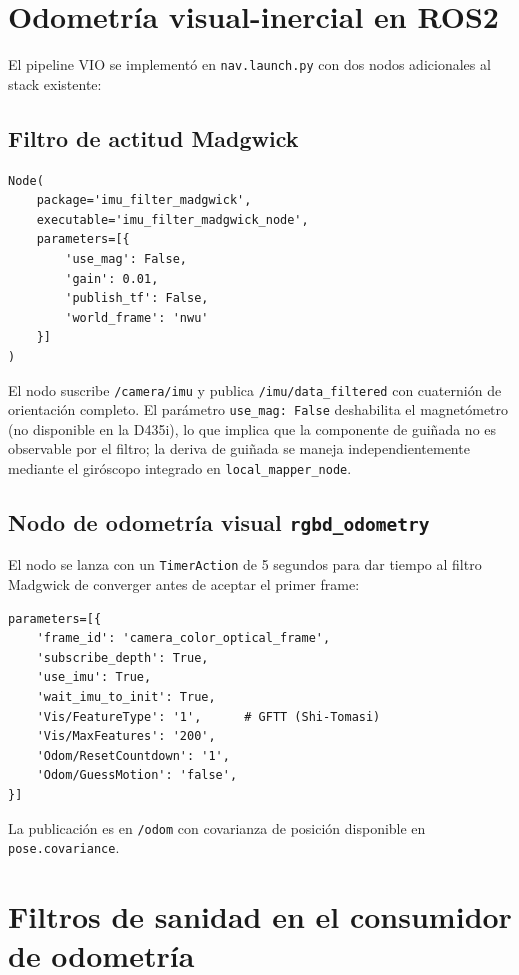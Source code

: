 \section{Odometría visual-inercial en ROS2}
\label{sec:impl-vio}

El pipeline VIO se implementó en \texttt{nav.launch.py} con dos nodos adicionales al stack existente:

\subsection{Filtro de actitud Madgwick}

\begin{verbatim}
Node(
    package='imu_filter_madgwick',
    executable='imu_filter_madgwick_node',
    parameters=[{
        'use_mag': False,
        'gain': 0.01,
        'publish_tf': False,
        'world_frame': 'nwu'
    }]
)
\end{verbatim}

El nodo suscribe \texttt{/camera/imu} y publica \texttt{/imu/data\_filtered} con cuaternión de orientación completo. El parámetro \texttt{use\_mag: False} deshabilita el magnetómetro (no disponible en la D435i), lo que implica que la componente de guiñada no es observable por el filtro; la deriva de guiñada se maneja independientemente mediante el giróscopo integrado en \texttt{local\_mapper\_node}.

\subsection{Nodo de odometría visual \texttt{rgbd\_odometry}}

El nodo se lanza con un \texttt{TimerAction} de 5 segundos para dar tiempo al filtro Madgwick de converger antes de aceptar el primer frame:

\begin{verbatim}
parameters=[{
    'frame_id': 'camera_color_optical_frame',
    'subscribe_depth': True,
    'use_imu': True,
    'wait_imu_to_init': True,
    'Vis/FeatureType': '1',      # GFTT (Shi-Tomasi)
    'Vis/MaxFeatures': '200',
    'Odom/ResetCountdown': '1',
    'Odom/GuessMotion': 'false',
}]
\end{verbatim}

La publicación es en \texttt{/odom} con covarianza de posición disponible en \texttt{pose.covariance}.

\section{Filtros de sanidad en el consumidor de odometría}
\label{sec:impl-sanity}

